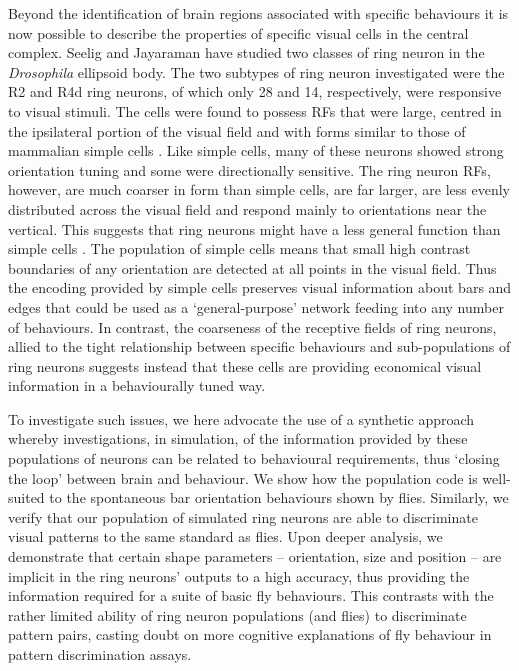 Beyond the identification of brain regions associated with specific behaviours it is now possible to describe the properties of specific visual cells in the central complex. Seelig and Jayaraman \cite{Seelig2013} have studied two classes of ring neuron in the \emph{Drosophila} ellipsoid body.
The two subtypes of ring neuron investigated were the R2 and R4d ring neurons, of which only 28 and 14, respectively, were responsive to visual stimuli.
The cells were found to possess \acp{RF} that were large, centred in the ipsilateral portion of the visual field and with forms similar to those of mammalian simple cells \cite{Hubel1962}.
Like simple cells, many of these neurons showed strong orientation tuning and some were directionally sensitive.
The ring neuron \acp{RF}, however, are much coarser in form than simple cells, are far larger, are less evenly distributed across the visual field and respond mainly to orientations near the vertical.
This suggests that ring neurons might have a less general function than simple cells \cite{Wystrach2014}.
The population of simple cells means that small high contrast boundaries of any orientation are detected at all points in the visual field.
Thus the encoding provided by simple cells preserves visual information about bars and edges that could be used as a `general-purpose' network feeding into any number of behaviours.
In contrast, the coarseness of the receptive fields of ring neurons, allied to the tight relationship between specific behaviours and sub-populations of ring neurons suggests instead that these cells are providing economical visual information in a behaviourally tuned way.

To investigate such issues, we here advocate the use of a synthetic approach whereby investigations, in simulation, of the information provided by these populations of neurons can be related to behavioural requirements, thus `closing the loop' between brain and behaviour. We show how the population code is well-suited to the spontaneous bar orientation behaviours shown by flies. Similarly, we verify that our population of simulated ring neurons are able to discriminate visual patterns to the same standard as flies.
Upon deeper analysis, we demonstrate that certain shape parameters -- orientation, size and position -- are implicit in the ring neurons' outputs to a high accuracy, thus providing the information required for a suite of basic fly behaviours.
This contrasts with the rather limited ability of ring neuron populations (and flies) to discriminate pattern pairs, casting doubt on more cognitive explanations of fly behaviour in pattern discrimination assays.
